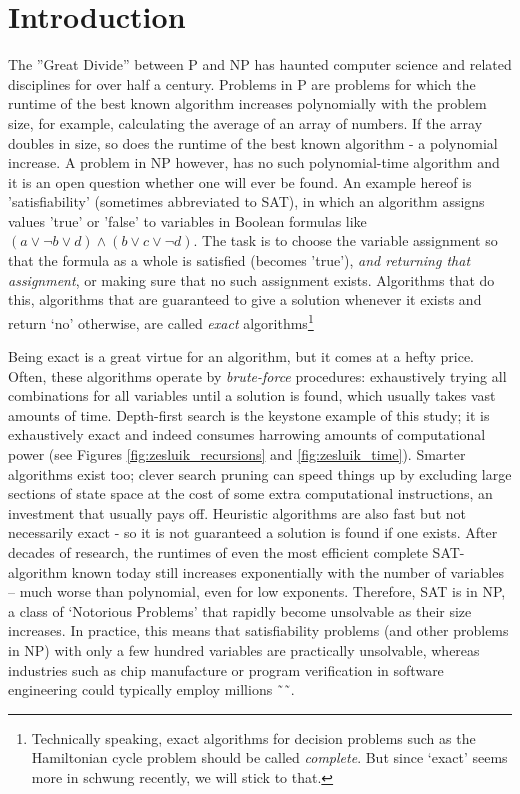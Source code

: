 \documentclass[10pt,conference,compsocconf]{IEEEtran}
\begin{document}
\section{Introduction}
\noindent The ''Great Divide'' between P and NP has haunted computer science and related disciplines for over half a century. Problems in P are problems for which the runtime of the best known algorithm increases polynomially with the problem size, for example, calculating the average of an array of numbers. If the array doubles in size, so does the runtime of the best known algorithm - a polynomial increase. A problem in NP however, has no such polynomial-time algorithm and it is an open question whether one will ever be found. An example hereof is 'satisfiability' (sometimes abbreviated to SAT), in which an algorithm assigns values 'true' or 'false' to variables in Boolean formulas like $( a \lor \lnot b \lor d ) \land ( b \lor c \lor \lnot d )$. The task is to choose the variable assignment so that the formula as a whole is satisfied (becomes 'true'), \textit{and returning that assignment}, or making sure that no such assignment exists. Algorithms that do this, algorithms that are guaranteed to give a solution whenever it exists and return ‘no’ otherwise, are called \textit{exact} algorithms\footnote{Technically speaking, exact algorithms for decision problems such as the Hamiltonian cycle problem should be called \textit{complete}. But since `exact' seems more in schwung recently, we will stick to that.}

Being exact is a great virtue for an algorithm, but it comes at a hefty price. Often, these algorithms operate by \textit{brute-force} procedures: exhaustively trying all combinations for all variables until a solution is found, which usually takes vast amounts of time. Depth-first search is the keystone example of this study; it is exhaustively exact and indeed consumes harrowing amounts of computational power (see Figures \ref{fig:zesluik_recursions} and \ref{fig:zesluik_time}). Smarter algorithms exist too; clever search pruning can speed things up by excluding large sections of state space at the cost of some extra computational instructions, an investment that usually pays off. Heuristic algorithms are also fast but not necessarily exact - so it is not guaranteed a solution is found if one exists. After decades of research, the runtimes of even the most efficient complete SAT-algorithm known today still increases exponentially with the number of variables -- much worse than polynomial, even for low exponents. Therefore, SAT is in NP, a class of `Notorious Problems' that rapidly become unsolvable as their size increases. In practice, this means that satisfiability problems (and other problems in NP) with only a few hundred variables are practically unsolvable, whereas industries such as chip manufacture or program verification in software engineering could typically employ millions ˜\cite{bryant1991complexity}˜\cite{ivanvcic2008efficient}.  
\end{document}
